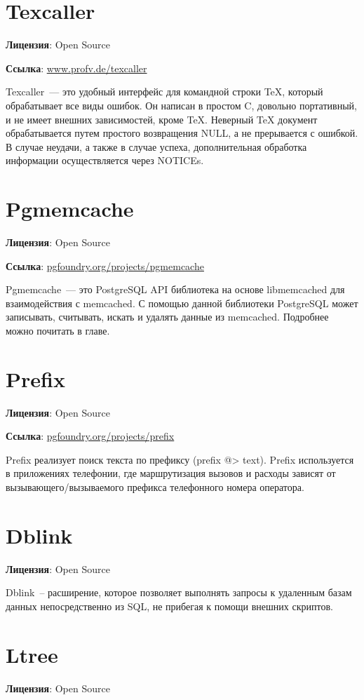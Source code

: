 \section{Texcaller}
\textbf{Лицензия}: Open Source

\textbf{Ссылка}: \href{http://www.profv.de/texcaller/}{www.profv.de/texcaller}

Texcaller~--- это удобный интерфейс для командной строки TeX, который обрабатывает все виды ошибок. Он написан в простом C, довольно портативный, и не имеет внешних зависимостей, кроме TeX. Неверный TeX документ обрабатывается путем простого возвращения NULL, а не прерывается с ошибкой. В случае неудачи, а также в случае успеха, дополнительная обработка информации осуществляется через NOTICEs.

\section{Pgmemcache}
\textbf{Лицензия}: Open Source

\textbf{Ссылка}: \href{http://pgfoundry.org/projects/pgmemcache/}{pgfoundry.org/projects/pgmemcache}

Pgmemcache~--- это PostgreSQL API библиотека на основе libmemcached для взаимодействия с memcached. С помощью данной библиотеки PostgreSQL может записывать, считывать, искать и удалять данные из memcached. Подробнее можно почитать в  главе.

\section{Prefix}
\textbf{Лицензия}: Open Source

\textbf{Ссылка}: \href{http://pgfoundry.org/projects/prefix}{pgfoundry.org/projects/prefix}

Prefix реализует поиск текста по префиксу (prefix @> text). Prefix используется в приложениях телефонии, где маршрутизация вызовов и расходы зависят от вызывающего/вызываемого префикса телефонного номера оператора.

\section{Dblink}
\textbf{Лицензия}: Open Source

Dblink~-- расширение, которое позволяет выполнять запросы к удаленным базам данных непосредственно из SQL, не прибегая к помощи внешних скриптов.

\section{Ltree}
\textbf{Лицензия}: Open Source


